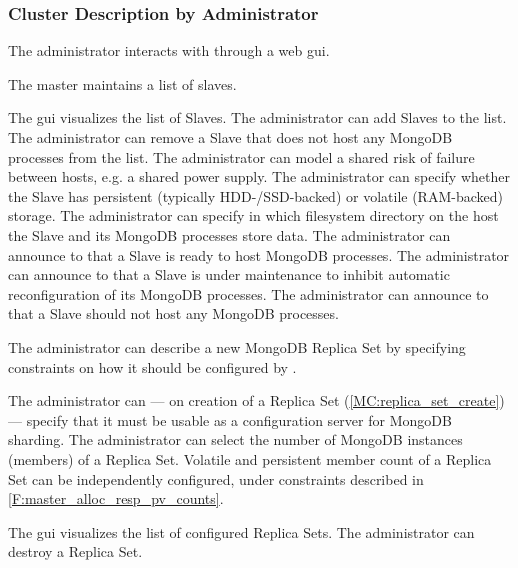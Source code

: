\subsubsection{Cluster Description by Administrator}
\begin{description}
	
	 The administrator interacts with \mamid through a web gui. \done
	
	 The master maintains a list of slaves. \done
	\begin{description}
		 The gui visualizes the list of Slaves. \done
		 The administrator can add Slaves to the list. \done
		 The administrator can remove a Slave that does not host any MongoDB processes from the 
		list. \done
		 The administrator can model a shared risk of failure between hosts, e.g. a shared power 
		supply. \done
		 The administrator can specify whether the Slave has persistent (typically HDD-/SSD-backed) or 
		volatile (RAM-backed) storage. \done
		 The administrator can specify in which filesystem directory on the host the Slave 
		and its MongoDB processes store data. %
		 The administrator can announce to \mamid that a Slave is ready to host MongoDB processes. 
		\done
		 The administrator can announce to \mamid that a Slave is under maintenance to inhibit 
		automatic reconfiguration of its MongoDB processes. \done %
		 The administrator can announce to \mamid that a Slave should not host any MongoDB processes. 
		\done
	\end{description}
	
	 The administrator can describe a new MongoDB Replica Set by specifying constraints on 
	how it should be configured by \mamid. \done
	\begin{description}
		 The administrator can --- on creation of a Replica Set 
		(\ref{MC:replica_set_create}) --- specify that it must be usable as a configuration server for MongoDB sharding. 
		\done
		 The administrator can select the number of MongoDB instances (members) of a 
		Replica Set. \done
		 Volatile and persistent member count of a Replica Set can be independently 
		configured, under constraints described in \ref{F:master_alloc_resp_pv_counts}. \done
	\end{description}
	 The gui visualizes the list of configured Replica Sets. \done
	 The administrator can destroy a Replica Set. \done
	
\end{description}

